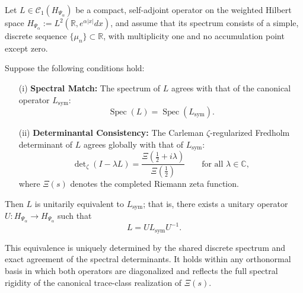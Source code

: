 \begin{lemma}
\label{lem:inverse_spectral_uniqueness}
Let \( L \in \mathcal{C}_1(H_{\Psi_\alpha}) \) be a compact, self-adjoint operator on the weighted Hilbert space \( H_{\Psi_\alpha} := L^2(\mathbb{R}, e^{\alpha |x|} dx) \), and assume that its spectrum consists of a simple, discrete sequence \( \{ \mu_n \} \subset \mathbb{R} \), with multiplicity one and no accumulation point except zero.

Suppose the following conditions hold:
\begin{enumerate}
  \item[\textnormal{(i)}] \textbf{Spectral Match:} The spectrum of \( L \) agrees with that of the canonical operator \( L_{\mathrm{sym}} \):
  \[
  \operatorname{Spec}(L) = \operatorname{Spec}(L_{\mathrm{sym}}).
  \]
  
  \item[\textnormal{(ii)}] \textbf{Determinantal Consistency:} The Carleman \(\zeta\)-regularized Fredholm determinant of \( L \) agrees globally with that of \( L_{\mathrm{sym}} \):
  \[
  \det\nolimits_\zeta(I - \lambda L) = \frac{\Xi\left( \tfrac{1}{2} + i\lambda \right)}{\Xi\left( \tfrac{1}{2} \right)} \qquad \text{for all } \lambda \in \mathbb{C},
  \]
  where \( \Xi(s) \) denotes the completed Riemann zeta function.
\end{enumerate}

Then \( L \) is unitarily equivalent to \( L_{\mathrm{sym}} \); that is, there exists a unitary operator \( U : H_{\Psi_\alpha} \to H_{\Psi_\alpha} \) such that
\[
L = U L_{\mathrm{sym}} U^{-1}.
\]

\medskip
\noindent
This equivalence is uniquely determined by the shared discrete spectrum and exact agreement of the spectral determinants. It holds within any orthonormal basis in which both operators are diagonalized and reflects the full spectral rigidity of the canonical trace-class realization of \( \Xi(s) \).
\end{lemma}

